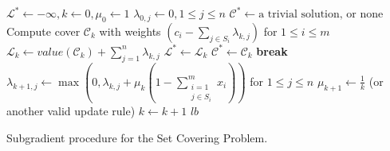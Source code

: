 \begin{enumerate}
    \begin{algorithm}[h]
    \begin{algorithmic}[1]
    \STATE $\mathcal{L}^\ast \gets -\infty, k \gets 0, \mu_0 \gets 1$
    \STATE $\lambda_{0,j} \gets 0, 1 \le j \le n$
    \STATE $\mathcal{C}^\ast \gets \text{a trivial solution, or none}$
        \STATE Compute cover $\mathcal{C}_k$ with weights $\left(c_i - \sum_{j \in S_i} \lambda_{k,j}\right)$ for $1 \le i \le m$
        \STATE $\mathcal{L}_k \gets value\left(\mathcal{C}_k\right) + \sum_{j=1}^n \lambda_{k,j}$
            \STATE $\mathcal{L}^\ast \gets \mathcal{L}_k$
        \ENDIF
            \STATE $\mathcal{C}^\ast \gets \mathcal{C}_k$
        \ENDIF
            \STATE \textbf{break}
        \ENDIF
        \STATE $\lambda_{k+1,j} \gets \max \left(0, \lambda_{k,j} + \mu_k \left(1 - \sum_{\substack{i=1\\j\in S_i}}^m x_i \right)\right)$ for $1 \le j \le n$
        \STATE $\mu_{k+1} \gets \frac{1}{k}$ (or another valid update rule)
        \STATE $k \gets k+1$
    \ENDWHILE
    \RETURN $lb$
    \end{algorithmic}
    \caption{Subgradient procedure for the Set Covering Problem.}
    \label{subgradient}
    \end{algorithm}
\end{enumerate}